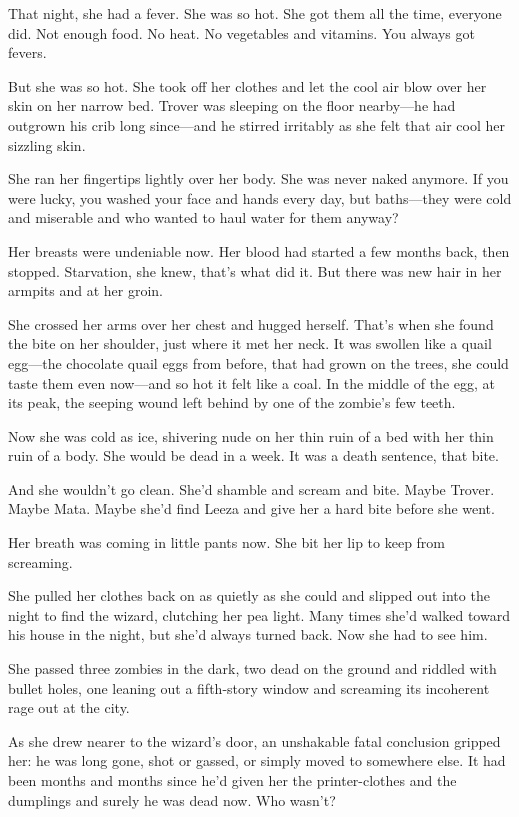 That night, she had a fever. She was so hot. She got them all the
time, everyone did. Not enough food. No heat. No vegetables and
vitamins. You always got fevers.

But she was so hot. She took off her clothes and let the cool air
blow over her skin on her narrow bed. Trover was sleeping on the
floor nearby—he had outgrown his crib long since—and he stirred
irritably as she felt that air cool her sizzling skin.

She ran her fingertips lightly over her body. She was never naked
anymore. If you were lucky, you washed your face and hands every
day, but baths—they were cold and miserable and who wanted to haul
water for them anyway?

Her breasts were undeniable now. Her blood had started a few months
back, then stopped. Starvation, she knew, that’s what did it. But
there was new hair in her armpits and at her groin.

She crossed her arms over her chest and hugged herself. That’s when
she found the bite on her shoulder, just where it met her neck. It
was swollen like a quail egg—the chocolate quail eggs from before,
that had grown on the trees, she could taste them even now—and so
hot it felt like a coal. In the middle of the egg, at its peak, the
seeping wound left behind by one of the zombie’s few teeth.

Now she was cold as ice, shivering nude on her thin ruin of a bed
with her thin ruin of a body. She would be dead in a week. It was a
death sentence, that bite.

And she wouldn’t go clean. She’d shamble and scream and bite. Maybe
Trover. Maybe Mata. Maybe she’d find Leeza and give her a hard bite
before she went.

Her breath was coming in little pants now. She bit her lip to keep
from screaming.

She pulled her clothes back on as quietly as she could and slipped
out into the night to find the wizard, clutching her pea light.
Many times she’d walked toward his house in the night, but she’d
always turned back. Now she had to see him.

She passed three zombies in the dark, two dead on the ground and
riddled with bullet holes, one leaning out a fifth-story window and
screaming its incoherent rage out at the city.

As she drew nearer to the wizard’s door, an unshakable fatal
conclusion gripped her: he was long gone, shot or gassed, or simply
moved to somewhere else. It had been months and months since he’d
given her the printer-clothes and the dumplings and surely he was
dead now. Who wasn’t?

